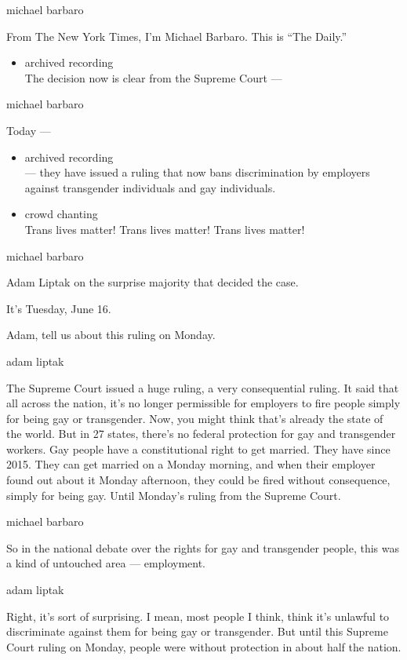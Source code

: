 michael barbaro

From The New York Times, I'm Michael Barbaro. This is ``The Daily.''

\begin{itemize}
\tightlist
\item
  archived recording\\
  The decision now is clear from the Supreme Court ---
\end{itemize}

michael barbaro

Today ---

\begin{itemize}
\item
  archived recording\\
  --- they have issued a ruling that now bans discrimination by
  employers against transgender individuals and gay individuals.
\item
  crowd chanting\\
  Trans lives matter! Trans lives matter! Trans lives matter!
\end{itemize}

michael barbaro

Adam Liptak on the surprise majority that decided the case.

It's Tuesday, June 16.

Adam, tell us about this ruling on Monday.

adam liptak

The Supreme Court issued a huge ruling, a very consequential ruling. It
said that all across the nation, it's no longer permissible for
employers to fire people simply for being gay or transgender. Now, you
might think that's already the state of the world. But in 27 states,
there's no federal protection for gay and transgender workers. Gay
people have a constitutional right to get married. They have since 2015.
They can get married on a Monday morning, and when their employer found
out about it Monday afternoon, they could be fired without consequence,
simply for being gay. Until Monday's ruling from the Supreme Court.

michael barbaro

So in the national debate over the rights for gay and transgender
people, this was a kind of untouched area --- employment.

adam liptak

Right, it's sort of surprising. I mean, most people I think, think it's
unlawful to discriminate against them for being gay or transgender. But
until this Supreme Court ruling on Monday, people were without
protection in about half the nation.

